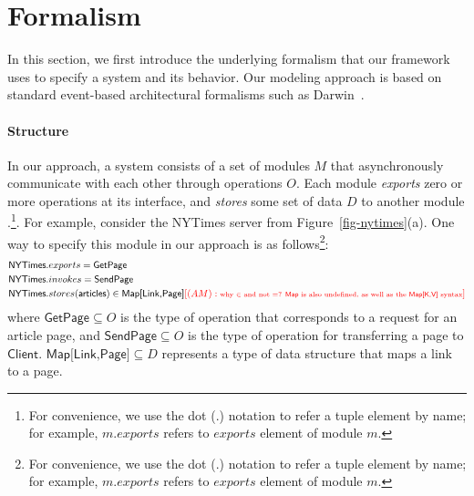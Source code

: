 
\section{Formalism}
\label{sec-formalism}

In this section, we first introduce the underlying formalism that our
framework uses to specify a system and its behavior. Our modeling
approach is based on standard event-based architectural formalisms
such as Darwin~\cite{darwin}.

\paragraph{\textbf{Structure}} In our approach, a system consists of a
set of modules $M$ that asynchronously communicate with each other
through operations $O$.  Each module \textit{exports} zero or more
operations at its interface, and \textit{stores} some set
of data $D$ to
another module .\footnote{For convenience, we use the dot (.) notation to
  refer a tuple element by name; for example, $m.exports$ refers to
  $exports$ element of module $m$.}. 
For example, consider the \textsf{NYTimes} server from
Figure~\ref{fig-nytimes}(a). One way to specify this module in our
approach is as follows\footnote{For convenience, we use the dot
  (.) notation to refer a tuple element by name; for example,
  $m.exports$ refers to $exports$ element of module $m$.}:
\begin{align*}
&\textsf{NYTimes}.exports = \textsf{GetPage}\\
&\textsf{NYTimes}.invokes = \textsf{SendPage}\\
&\textsf{NYTimes}.stores(\textsf{articles}) \in
\textsf{Map[Link,Page]} \am{\mbox{why $\in$ and not $=$? \textsf{Map} is also undefined, as well as the \textsf{Map[K,V]} syntax}}
\end{align*}
where $\textsf{GetPage} \subseteq O$ is the type of operation that
corresponds to a request for an article page, and $\textsf{SendPage}
\subseteq O$ is the type of operation for transferring a page to
$\textsf{Client}$. $\textsf{Map[Link,Page]} \subseteq D$ represents a
type of data structure that maps a link to a page. 

